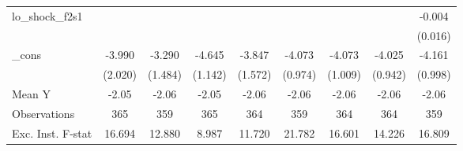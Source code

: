 {\begin{tabular}{l*{8}{c}}
\addlinespace
lo\_shock\_f2s1&                     &                     &                     &                     &                     &                     &                     &      -0.004         \\
            &                     &                     &                     &                     &                     &                     &                     &     (0.016)         \\
\addlinespace
\_cons      &      -3.990\sym{*}  &      -3.290\sym{**} &      -4.645\sym{***}&      -3.847\sym{**} &      -4.073\sym{***}&      -4.073\sym{***}&      -4.025\sym{***}&      -4.161\sym{***}\\
            &     (2.020)         &     (1.484)         &     (1.142)         &     (1.572)         &     (0.974)         &     (1.009)         &     (0.942)         &     (0.998)         \\
\midrule
Mean Y      &       -2.05         &       -2.06         &       -2.05         &       -2.06         &       -2.06         &       -2.06         &       -2.06         &       -2.06         \\
Observations&         365         &         359         &         365         &         364         &         359         &         364         &         364         &         359         \\
Exc. Inst. F-stat&      16.694         &      12.880         &       8.987         &      11.720         &      21.782         &      16.601         &      14.226         &      16.809         \\
\bottomrule
\end{tabular}
}
